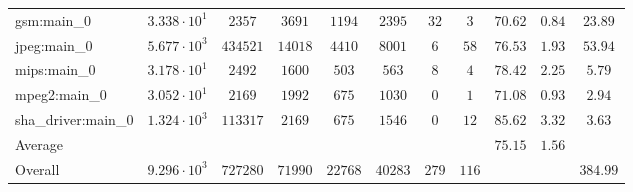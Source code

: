 \begin{tabular}{|l|c|c|c|c|c|c|c|c|c|c|}
gsm:main\_0             & $ 3.338 \cdot 10^{1} $ & $ 2357   $ & $ 3691  $ & $ 1194  $ & $ 2395  $ & $ 32  $ & $ 3   $ & $ 70.62       $ & $ 0.84    $ & $ 23.89   $ \\
jpeg:main\_0            & $ 5.677 \cdot 10^{3} $ & $ 434521 $ & $ 14018 $ & $ 4410  $ & $ 8001  $ & $ 6   $ & $ 58  $ & $ 76.53       $ & $ 1.93    $ & $ 53.94   $ \\
mips:main\_0            & $ 3.178 \cdot 10^{1} $ & $ 2492   $ & $ 1600  $ & $ 503   $ & $ 563   $ & $ 8   $ & $ 4   $ & $ 78.42       $ & $ 2.25    $ & $ 5.79    $ \\
mpeg2:main\_0           & $ 3.052 \cdot 10^{1} $ & $ 2169   $ & $ 1992  $ & $ 675   $ & $ 1030  $ & $ 0   $ & $ 1   $ & $ 71.08       $ & $ 0.93    $ & $ 2.94    $ \\
sha\_driver:main\_0     & $ 1.324 \cdot 10^{3} $ & $ 113317 $ & $ 2169  $ & $ 675   $ & $ 1546  $ & $ 0   $ & $ 12  $ & $ 85.62       $ & $ 3.32    $ & $ 3.63    $ \\
\hline
Average                 & $                    $ & $        $ & $       $ & $       $ & $       $ & $     $ & $     $ & $ 75.15       $ & $ 1.56    $ & $         $ \\
\hline
Overall                 & $ 9.296 \cdot 10^{3} $ & $ 727280 $ & $ 71990 $ & $ 22768 $ & $ 40283 $ & $ 279 $ & $ 116 $ & $             $ & $         $ & $ 384.99  $ \\
\hline
\end{tabular}
